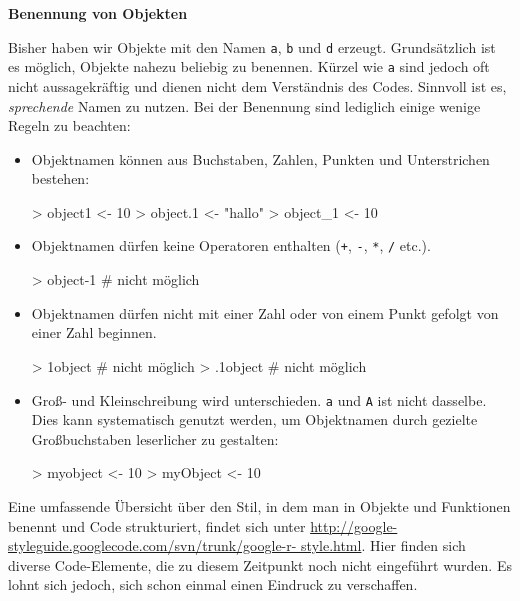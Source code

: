              
\vspace*{5mm}
\textbf{Benennung von Objekten}

Bisher haben wir Objekte mit den Namen \verb!a!, \verb!b! und \verb!d! erzeugt. Grundsätzlich ist es möglich, Objekte nahezu beliebig zu benennen. Kürzel wie \verb!a! sind jedoch oft nicht aussagekräftig und dienen nicht dem Verständnis des Codes. Sinnvoll ist es, \emph{sprechende} Namen zu nutzen. Bei der Benennung sind lediglich einige wenige Regeln zu beachten: 

\begin{itemize}
  \item Objektnamen können aus Buchstaben, Zahlen, Punkten und Unterstrichen bestehen:
\begin{Schunk}
\begin{Sinput}
>   object1 <- 10    
>   object.1 <- "hallo" 
>   object_1 <- 10
\end{Sinput}
\end{Schunk}
  \item Objektnamen dürfen keine Operatoren enthalten (\verb!+!, \verb!-!, \verb!*!, \verb!/! etc.).  
  \begin{Schunk} 
    \begin{Sinput}
> object-1    # nicht möglich
    \end{Sinput} 
  \end{Schunk}  
  \item Objektnamen dürfen nicht mit einer Zahl oder von einem Punkt gefolgt von einer Zahl beginnen. 
  \begin{Schunk} 
    \begin{Sinput}
> 1object     # nicht möglich
> .1object    # nicht möglich
    \end{Sinput} 
  \end{Schunk}
  \item Groß- und Kleinschreibung wird unterschieden. \verb!a! und \verb!A! ist nicht dasselbe. Dies kann systematisch genutzt werden, um Objektnamen durch gezielte Großbuchstaben leserlicher zu gestalten:
\begin{Schunk}
\begin{Sinput}
> myobject <- 10
> myObject <- 10
\end{Sinput}
\end{Schunk}
\end{itemize}

Eine umfassende Übersicht über den Stil, in dem man in \R{} Objekte und Funktionen benennt und Code strukturiert, findet sich unter \url{http://google-styleguide.googlecode.com/svn/trunk/google-r- style.html}. Hier finden sich diverse Code-Elemente, die zu diesem Zeitpunkt noch nicht eingeführt wurden. Es lohnt sich jedoch, sich schon einmal einen Eindruck zu verschaffen.


